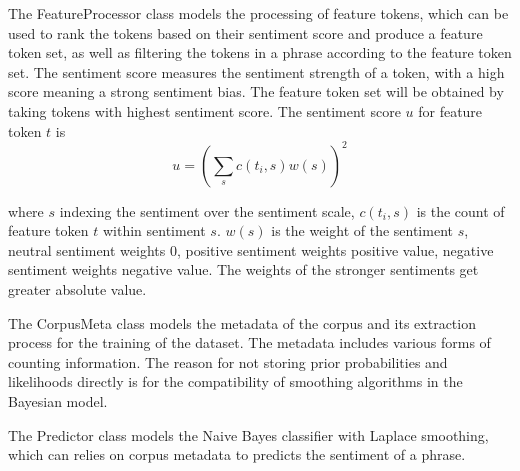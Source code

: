 \documentclass[11pt,a4paper]{article}
\begin{document}
The FeatureProcessor class models the processing of feature tokens, which can be used to rank the tokens based on their sentiment score and produce a feature token set, as well as filtering the tokens in a phrase according to the feature token set. The sentiment score measures the sentiment strength of a token, with a high score meaning a strong sentiment bias. The feature token set will be obtained by taking tokens with highest sentiment score. The sentiment score \(u\) for feature token \(t\) is
\setlength{\lineskip}{0em}
\begin{equation}
    u = {(\sum_{s}c(t_i,s)w(s))}^2
\end{equation}

where \(s\) indexing the sentiment over the sentiment scale, \(c(t_i,s)\) is the count of feature token \(t\) within sentiment \(s\). \(w(s)\) is the weight of the sentiment \(s\), neutral sentiment weights 0, positive sentiment weights positive value, negative sentiment weights negative value. The weights of the stronger sentiments get greater absolute value.

The CorpusMeta class models the metadata of the corpus and its extraction process for the training of the dataset. The metadata includes various forms of counting information. The reason for not storing prior probabilities and likelihoods directly is for the compatibility of smoothing algorithms in the Bayesian model.

The Predictor class models the Naive Bayes classifier with Laplace smoothing, which can relies on corpus metadata to predicts the sentiment of a phrase.





\end{document}
